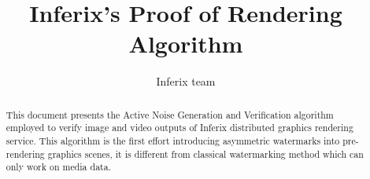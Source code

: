 \documentclass[a4paper,11pt,onecolumn]{memoir}
\author{
    Inferix team
}
\title{Inferix's Proof of Rendering Algorithm}
\begin{document}

\frontmatter

\maketitle

\begin{abstract}
    This document presents the Active Noise Generation and Verification algorithm employed to verify image and video outputs of Inferix distributed graphics rendering service. This algorithm is the first effort introducing asymmetric watermarks into pre-rendering graphics scenes, it is different from classical watermarking method which can only work on media data.
\end{abstract}
\clearpage

\tableofcontents*
\clearpage

\mainmatter






\backmatter

\printbibliography
\end{document}
